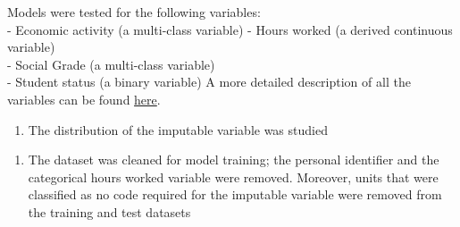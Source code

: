 \documentclass[]{book}
\newenvironment{Shaded}{\begin{snugshade}}{\end{snugshade}}
\newcommand{\KeywordTok}[1]{\textcolor[rgb]{0.13,0.29,0.53}{\textbf{#1}}}
\newcommand{\DataTypeTok}[1]{\textcolor[rgb]{0.13,0.29,0.53}{#1}}
\newcommand{\DecValTok}[1]{\textcolor[rgb]{0.00,0.00,0.81}{#1}}
\newcommand{\StringTok}[1]{\textcolor[rgb]{0.31,0.60,0.02}{#1}}
\newcommand{\CommentTok}[1]{\textcolor[rgb]{0.56,0.35,0.01}{\textit{#1}}}
\newcommand{\OperatorTok}[1]{\textcolor[rgb]{0.81,0.36,0.00}{\textbf{#1}}}
\newcommand{\NormalTok}[1]{#1}
\providecommand{\tightlist}{%
  \setlength{\itemsep}{0pt}\setlength{\parskip}{0pt}}
\begin{document}
Models were tested for the following variables:\\
- Economic activity (a multi-class variable) - Hours worked (a derived
continuous variable)\\
- Social Grade (a multi-class variable)\\
- Student status (a binary variable) A more detailed description of all
the variables can be found
\href{https://www.ons.gov.uk/census/2011census/2011censusdata/censusmicrodata/microdatateachingfile/variablelist}{here}.

\begin{enumerate}
\def\labelenumi{\arabic{enumi})}
\setcounter{enumi}{2}
\tightlist
\item
  The distribution of the imputable variable was studied
\end{enumerate}

\begin{Shaded}
\end{Shaded}

\begin{enumerate}
\def\labelenumi{\arabic{enumi})}
\setcounter{enumi}{3}
\tightlist
\item
  The dataset was cleaned for model training; the personal identifier
  and the categorical hours worked variable were removed. Moreover,
  units that were classified as no code required for the imputable
  variable were removed from the training and test datasets
\end{enumerate}
\end{document}
